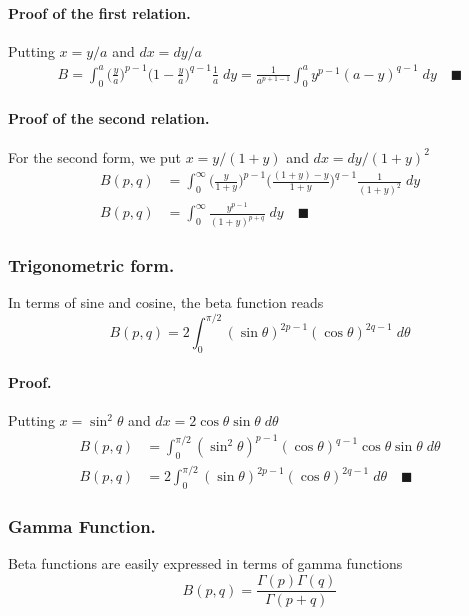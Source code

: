 \documentclass[../../main.tex]{subfiles}
\begin{document}
\paragraph{Proof of the first relation.} Putting $x = y/a$ and $dx=dy/a$
\begin{align*}
    B=\int_{0}^{a}\big(\frac{y}{a}\big)^{p-1}\big(1-\frac{y}{a}\big)^{q-1}\frac{1}{a}\;dy=\frac{1}{a^{p+1-1}}  \int_{0}^{a} y^{p-1}(a-y)^{q-1}\;dy \quad\blacksquare
\end{align*}

\paragraph{Proof of the second relation.} For the second form, we put $x = y/(1 + y)$ and $dx=dy/(1+y)^2$
\begin{align*}
    B(p,q)&=\int_{0}^{\infty}\bigg(\frac{y}{1+y} \bigg)^{p-1} \bigg(\frac{(1+y)-y}{1+y}\bigg)^{q-1}\frac{1}{(1+y)^2}\;dy\\
    B(p,q)&=\int_{0}^{\infty}\frac{y^{p-1}}{(1+y)^{p+q}}\;dy\quad\blacksquare
\end{align*}

\subsubsection*{Trigonometric form.} In terms of sine and cosine, the beta function reads 
\begin{equation*}
    B(p,q)=2\int_{0}^{\pi/2}(\sin \theta)^{2p-1}(\cos\theta)^{2q-1}\;d\theta
\end{equation*}

\paragraph{Proof.} Putting $x=\sin^2\theta$ and $dx=2\cos\theta\sin\theta\;d\theta$
\begin{align*}
    B(p,q)&=\int_{0}^{\pi/2} (\sin^2\theta)^{p-1}(\cos\theta)^{q-1} \cos\theta\sin\theta\;d\theta\\
    B(p,q)&=2\int_{0}^{\pi/2} (\sin \theta)^{2p-1}(\cos\theta)^{2q-1}\;d\theta\quad\blacksquare
\end{align*}

\subsubsection*{Gamma Function.}  Beta functions are easily expressed in terms of gamma functions
\begin{equation*}
    B(p,q)=\frac{\Gamma(p)\Gamma(q)}{\Gamma(p+q)}
\end{equation*}
\end{document}
